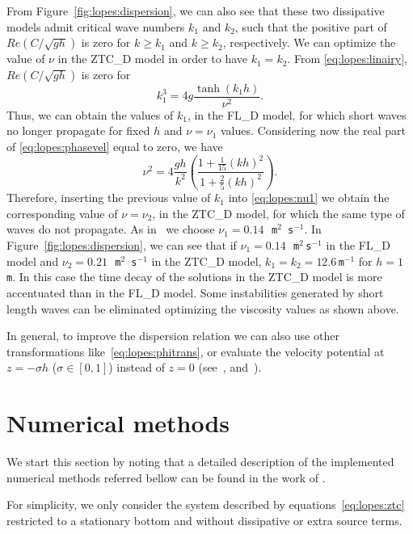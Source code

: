 From Figure~\ref{fig:lopes:dispersion}, we can also see that
these two dissipative models admit critical wave numbers $k_1$ and
$k_2$, such that the positive part of $\displaystyle
Re\left(C/\sqrt{gh}\right)$ is zero for $k\geqslant k_1$ and
$k\geqslant k_2$, respectively.  We can optimize the value of $\nu$ in
the ZTC\_D model in order to have $k_1=k_2$.  From
\eqref{eq:lopes:linairy}, $\displaystyle Re\left(C/\sqrt{gh}\right)$
is zero for
\begin{equation}
  k_1^3=4g\frac{\tanh{(k_1h)}}{\nu^2}.
\end{equation}
Thus, we can obtain the values of $k_1$, in the FL\_D model, for which
short waves no longer propagate for fixed $h$ and $\nu=\nu_1$ values.
Considering now the real part of \eqref{eq:lopes:phasevel} equal to
zero, we have
\begin{equation}
\label{eq:lopes:nu1}
\nu^2=4\frac{gh}{k^2}\left(\frac{1+\frac{1}{15}(kh)^2}{1 +
    \frac{2}{5}(kh)^2}\right).
\end{equation}
Therefore, inserting the previous value of $k_1$ into
\eqref{eq:lopes:nu1} we obtain the corresponding value of $\nu=\nu_2$,
in the ZTC\_D model, for which the same type of waves do not
propagate.  As in~\citet{DutykhDias2007} we choose $\nu_1=0.14$\,{\tt
m$^2$\,s$^{-1}$}.  In Figure~\ref{fig:lopes:dispersion}, we can see
that if $\nu_1=0.14\,$~{\tt m$^2\,$s$^{-1}$} in the FL\_D model and
$\nu_2=0.21\,$~{\tt m$^2$\,s$^{-1}$} in the ZTC\_D model,
$k_1=k_2=12.6$\,{\tt m$^{-1}$} for $h=1$\,{\tt m}.  In this case the
time decay of the solutions in the ZTC\_D model is more accentuated
than in the FL\_D model.  Some instabilities generated by short length
waves can be eliminated optimizing the viscosity values as shown
above.

In general, to improve the dispersion relation we can also use other
transformations like~\eqref{eq:lopes:phitrans}, or evaluate the
velocity potential at $z=-\sigma h$ ($\sigma\in[0,1]$) instead of
$z=0$ (see~\citet{BinghamMadsenFuhrman2008}, \citet{MadsenAgnon2003}
and~\citet{MadsenBinghamSchaffer2003}).

\section{Numerical methods}
\label{sec:lopes:numericalmethods}
We start this section by noting that a detailed description of the
implemented numerical methods referred bellow can be found in the work
of \citet{Lopes2007}.

For simplicity, we only consider the system described by
equations~\eqref{eq:lopes:ztc} restricted to a stationary bottom and
without dissipative or extra source terms.

